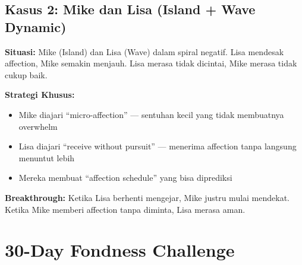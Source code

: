 \subsection{Kasus 2: Mike dan Lisa (Island + Wave Dynamic)}

\begin{insightbox}
\textbf{Situasi:} Mike (Island) dan Lisa (Wave) dalam spiral negatif. Lisa mendesak affection, Mike semakin menjauh. Lisa merasa tidak dicintai, Mike merasa tidak cukup baik.

\textbf{Strategi Khusus:}
\begin{itemize}
    \item Mike diajari ``micro-affection'' --- sentuhan kecil yang tidak membuatnya overwhelm
    \item Lisa diajari ``receive without pursuit'' --- menerima affection tanpa langsung menuntut lebih
    \item Mereka membuat ``affection schedule'' yang bisa diprediksi
\end{itemize}

\textbf{Breakthrough:} Ketika Lisa berhenti mengejar, Mike justru mulai mendekat. Ketika Mike memberi affection tanpa diminta, Lisa merasa aman.
\end{insightbox}

\section{30-Day Fondness Challenge}

